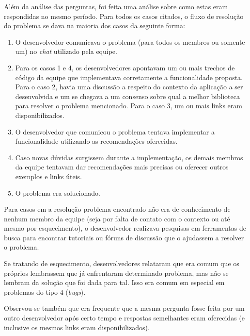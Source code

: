 %

Além da análise das perguntas, foi feita uma análise sobre como estas eram respondidas no mesmo período. Para todos os casos citados, o fluxo de resolução do problema se dava na maioria dos casos da seguinte forma:


\begin{enumerate}
  \item O desenvolvedor comunicava o problema (para todos os membros ou somente um) no \textit{chat} utilizado pela equipe.
  \item Para os casos 1 e 4, os desenvolvedores apontavam um ou mais trechos de código da equipe que implementava corretamente a funcionalidade proposta. Para o caso 2, havia uma discussão a respeito do contexto da aplicação a ser desenvolvida e um se chegava a um consenso sobre qual a melhor biblioteca para resolver o problema mencionado. Para o caso 3, um ou mais links eram disponibilizados.
  \item O desenvolvedor que comunicou o problema tentava implementar a funcionalidade utilizando as recomendações oferecidas.
  \item Caso novas dúvidas surgissem durante a implementação, os demais membros da equipe tentavam dar recomendações mais precisas ou oferecer outros exemplos e links úteis.
  \item O problema era solucionado.
\end{enumerate}

Para casos em a resolução problema encontrado não era de conhecimento de nenhum membro da equipe (seja por falta de contato com o contexto ou até mesmo por esquecimento), o desenvolvedor realizava pesquisas em ferramentas de busca para encontrar tutoriais ou fóruns de discussão que o ajudassem a resolver o problema.

Se tratando de esquecimento, desenvolvedores relataram que era comum que os próprios lembrassem que já enfrentaram determinado problema, mas não se lembram da solução que foi dada para tal. Isso era comum em especial em problemas do tipo 4 (\textit{bugs}).

Observou-se também que era frequente que a mesma pergunta fosse feita por um outro desenvolvedor após certo tempo e respostas semelhantes eram oferecidas (e inclusive os mesmos links eram disponibilizados).

